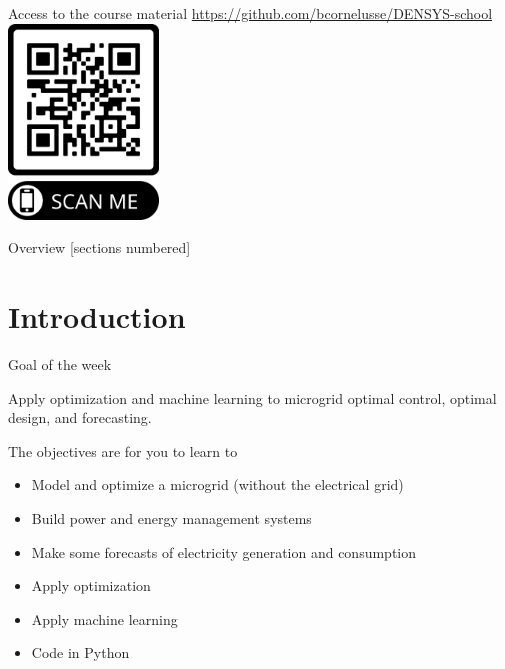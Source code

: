 \titleframe

\begin{frame}{Access to the course material}
    \centering
    \alert{\url{https://github.com/bcornelusse/DENSYS-school}}\\[2mm]
    \includegraphics[width=0.3\textwidth]{frame.png}
\end{frame}


\begin{frame}{Overview}
  [sections numbered]
  \tableofcontents[hideallsubsections]
\end{frame}


\section{Introduction}
\begin{frame}{Goal of the week}
\centering 
\begin{minipage}{0.7\textwidth}
\large Apply optimization and machine learning to microgrid optimal control, optimal design, and forecasting.
\end{minipage}
\end{frame}

\begin{frame}{The objectives are for you to learn to}
\begin{itemize}
    \item Model and optimize a microgrid (without the electrical grid) 
    \item Build power and energy management systems
    \item Make some forecasts of electricity generation and consumption
    \item Apply optimization
    \item Apply machine learning
    \item Code in Python
\end{itemize}
\end{frame}


